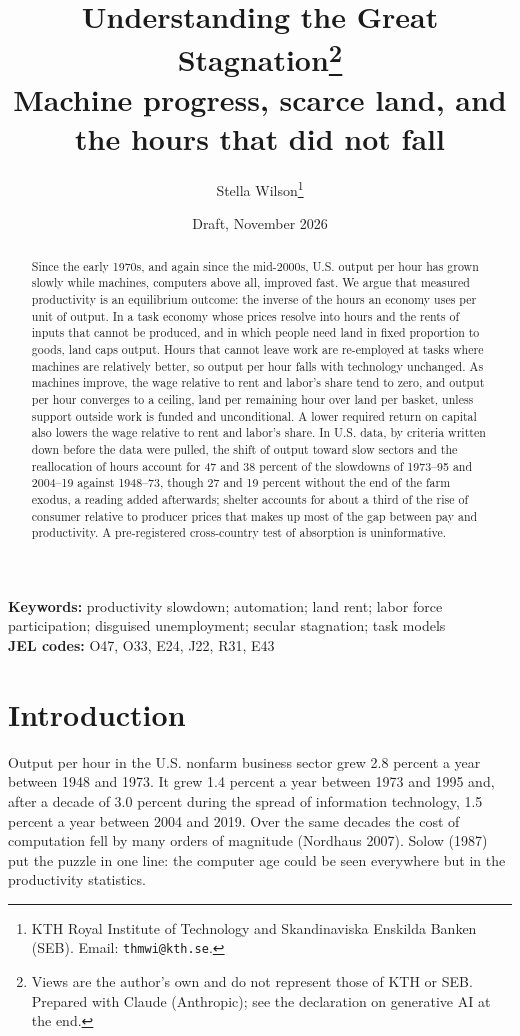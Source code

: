 \documentclass[12pt]{article}
\title{\bfseries Understanding the Great Stagnation\thanks{Views are the author's own and do not represent those of
  KTH or SEB. Prepared with Claude (Anthropic); see the declaration on generative AI at the end.}\\[7pt]
  \large\mdseries Machine progress, scarce land, and the hours that did not fall}
\author{Stella Wilson\thanks{KTH Royal Institute of Technology and Skandinaviska Enskilda Banken (SEB). Email:
  \texttt{thmwi@kth.se}.}}
\date{Draft, November 2026}
\theoremstyle{plain}
\begin{document}
\maketitle

\begin{abstract}
\noindent Since the early 1970s, and again since the mid-2000s, U.S. output per hour has grown slowly while machines, computers above all, improved fast. We argue that measured productivity is an equilibrium outcome: the inverse of the hours an economy uses per unit of output. In a task economy whose prices resolve into hours and the rents of inputs that cannot be produced, and in which people need land in fixed proportion to goods, land caps output. Hours that cannot leave work are re-employed at tasks where machines are relatively better, so output per hour falls with technology unchanged. As machines improve, the wage relative to rent and labor's share tend to zero, and output per hour converges to a ceiling, land per remaining hour over land per basket, unless support outside work is funded and unconditional. A lower required return on capital also lowers the wage relative to rent and labor's share. In U.S. data, by criteria written down before the data were pulled, the shift of output toward slow sectors and the reallocation of hours account for 47 and 38 percent of the slowdowns of 1973--95 and 2004--19 against 1948--73, though 27 and 19 percent without the end of the farm exodus, a reading added afterwards; shelter accounts for about a third of the rise of consumer relative to producer prices that makes up most of the gap between pay and productivity. A pre-registered cross-country test of absorption is uninformative.
\end{abstract}

\noindent\textbf{Keywords:} productivity slowdown; automation; land rent; labor force participation; disguised unemployment; secular stagnation; task models\\
\textbf{JEL codes:} O47, O33, E24, J22, R31, E43

\section{Introduction}\label{sec:1}

Output per hour in the U.S. nonfarm business sector grew 2.8 percent a year between 1948 and 1973. It grew 1.4 percent a year between 1973 and 1995 and, after a decade of 3.0 percent during the spread of information technology, 1.5 percent a year between 2004 and 2019. Over the same decades the cost of computation fell by many orders of magnitude (Nordhaus 2007). Solow (1987) put the puzzle in one line: the computer age could be seen everywhere but in the productivity statistics.
\end{document}
